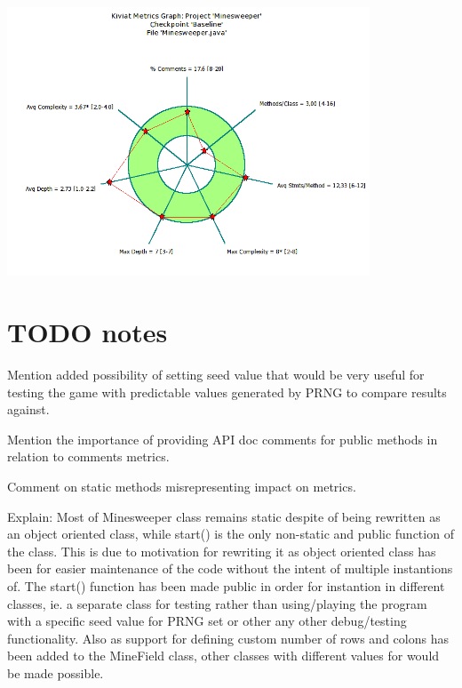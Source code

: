 \documentclass[UKenglish]{article}  %
\begin{document}
\includegraphics[height=8cm]{Minesweeper_java-kiviat-metrics-graph-original.png}

\section{TODO notes}
Mention added possibility of setting seed value that would be very useful for
testing the game with predictable values generated by PRNG to compare results
against.


Mention the importance of providing API doc comments for public methods in
relation to comments metrics.


Comment on static methods misrepresenting impact on metrics.

Explain: Most of Minesweeper class remains static despite of being rewritten
as an object oriented class, while start() is the only non-static and public
function of the class. This is due to motivation for rewriting it as object
oriented class has been for easier maintenance of the code without the intent
of multiple instantions of. The start() function has been made public in order
for instantion in different classes, ie. a separate class for testing rather
than using/playing the program with a specific seed value for PRNG set or
other any other debug/testing functionality.
Also as support for defining custom number of rows and colons has been added
to the MineField class, other classes with different values for would be
made possible.
\end{document}
